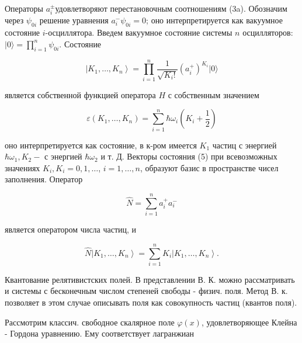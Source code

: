 \documentclass[10pt]{article}
\begin{document}
Операторы $a_{i}^{ \pm}$удовлетворяют перестановочным соотношениям (3a). Обозначим через $\psi_{0 i}$ решение уравнения $a_{i}^{-} \psi_{0 i}=0$; оно интерпретируется как вакуумное состояние $i$-осциллятора. Введем вакуумное состояние системы $n$ осцилляторов: $|0\rangle=\prod_{i=1}^{n} \psi_{0 i}$. Состояние



\[

\left|K_{1}, \ldots, K_{n}\right\rangle=\prod_{i=1}^{n} \frac{1}{\sqrt{K_{i} !}}\left(a_{i}^{+}\right)^{K_{i}}|0\rangle

\]



является собственной функцией оператора $H$ с собственным значением



\[

\varepsilon\left(K_{1}, \ldots, K_{n}\right)=\sum_{i=1}^{n} \hbar \omega_{i}\left(K_{i}+\frac{1}{2}\right)

\]



оно интерпретируется как состояние, в к-ром имеется $K_{1}$ частиц с энергией $\hbar \omega_{1}, K_{2}-$ с энергией $\hbar \omega_{2}$ и т. Д. Векторы состояния (5) при всевозможных значениях $K_{i}, K_{i}=0,1, \ldots$, $i=1, \ldots, n$, образуют базис в пространстве чисел заполнения. Оператор



\[

\hat{N}=\sum_{i=1}^{n} a_{i}^{+} a_{i}^{-}

\]



является оператором числа частиц, и



\[

\hat{N}\left|K_{1}, \ldots, K_{n}\right\rangle=\sum_{i=1}^{n} K_{i}\left|K_{1}, \ldots, K_{n}\right\rangle .

\]



Квантование релятивистских полей. В представлении В. К. можно рассматривать и системы с бесконечным числом степеней свободы - физич. поля. Метод В. к. позволяет в этом случае описывать поля как совокупность частиц (квантов поля).



Рассмотрим классич. свободное скалярное поле $\varphi(x)$, удовлетворяющее Клейна - Гордона уравнению. Ему соответствует лагранжиан
\end{document}
